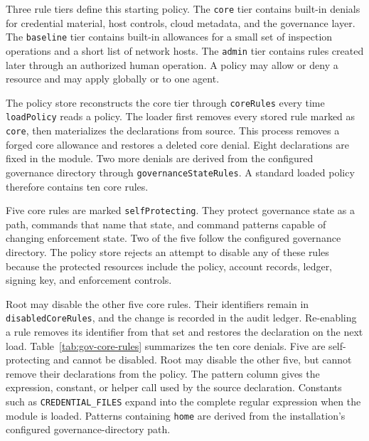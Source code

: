 Three rule tiers define this starting policy. The \texttt{core} tier contains
built-in denials for credential material, host controls, cloud metadata, and
the governance layer. The \texttt{baseline} tier contains built-in allowances
for a small set of inspection operations {\color{red}and a short list of
network hosts}. The \texttt{admin} tier contains
rules created later through an authorized human operation. A policy
may allow or deny a resource and may apply globally or to one agent.

The policy store reconstructs the core tier through \texttt{coreRules} every
time \texttt{loadPolicy} reads a policy. The loader first removes every stored
rule marked as \texttt{core}, then materializes the declarations from source.
This process removes a forged core allowance and restores a deleted core
denial. Eight declarations are fixed in the module. Two more denials are
derived from the configured governance directory through
\texttt{governanceStateRules}. A standard loaded policy therefore contains ten
core rules.

Five core rules are marked \texttt{selfProtecting}. They protect governance
state as a path, commands that name that state, and command patterns capable of
changing enforcement state. Two of the five follow the configured governance
directory. The policy store rejects an attempt to disable any of these rules
because the protected resources include the policy, account records, ledger,
signing key, and enforcement controls.

Root may disable the other five core rules. Their identifiers remain in \break
\texttt{disabledCoreRules}, and the change is recorded in the audit ledger.
Re-enabling a rule removes its identifier from that set and restores the
declaration on the next load.
Table~\ref{tab:gov-core-rules} summarizes the ten core denials. Five are
self-protecting and cannot be disabled. Root may disable the other five, but
cannot remove their declarations from the policy. The pattern column gives the
expression, constant, or helper call used by the source declaration. Constants
such as \texttt{CREDENTIAL\_FILES} expand into the complete regular expression
when the module is loaded. Patterns containing \texttt{home} are derived from
the installation's configured governance-directory path.

